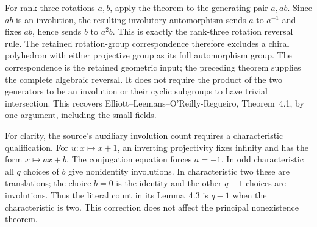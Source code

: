 For rank-three rotations $a,b$, apply the theorem to the generating pair
$a,ab$. Since $ab$ is an involution, the resulting involutory automorphism
sends $a$ to $a^{-1}$ and fixes $ab$, hence sends $b$ to $a^2b$.
This is exactly the rank-three rotation reversal rule. The retained
rotation-group correspondence therefore excludes a chiral polyhedron
with either projective group as its full automorphism group.
The correspondence is the retained geometric input; the preceding theorem
supplies the complete algebraic reversal. It does not require the product
of the two generators to be an involution or their cyclic subgroups to
have trivial intersection. This recovers Elliott--Leemans--O'Reilly-Regueiro,
Theorem~4.1, by one argument, including the small fields.

For clarity, the source's auxiliary involution count requires a
characteristic qualification. For $u:x\mapsto x+1$, an inverting
projectivity fixes infinity and has the form $x\mapsto ax+b$.
The conjugation equation forces $a=-1$. In odd characteristic all $q$
choices of $b$ give nonidentity involutions. In characteristic two these
are translations; the choice $b=0$ is the identity and the other $q-1$
choices are involutions. Thus the literal count in its Lemma~4.3 is $q-1$
when the characteristic is two. This correction does not affect the
principal nonexistence theorem.

